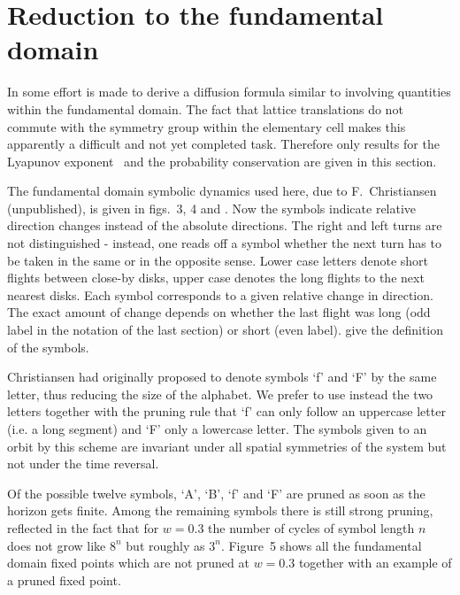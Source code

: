 \section{Reduction to the fundamental domain}

In  some effort is made to derive a diffusion formula similar to
 involving quantities within the fundamental domain. The
fact that lattice translations do not commute with the symmetry group within
the elementary cell makes this apparently a difficult and
not yet completed task.
Therefore only results for the Lyapunov exponent~ and the
probability conservation are given in this section.

The fundamental domain
symbolic dynamics used here, due to
F.~Christiansen (unpublished), is
given in figs.~3, 4 and . %
Now the symbols indicate relative direction changes
instead of the absolute directions.
The right and left turns are not distinguished - instead,  one reads
off a symbol whether the next
turn has to be taken in the same or in the opposite sense.
%
Lower case letters denote short flights between close-by disks, upper case
denotes the long flights to the next nearest disks.
Each symbol corresponds to a given relative change
in direction. The exact amount of
change depends on whether the last flight was
long (odd label in the notation of the last section) or short (even label).
give the definition of the symbols.

Christiansen had
originally proposed to denote symbols `f' and `F' by the same
letter, thus reducing the size of the alphabet.
We prefer to use instead the
two letters together with the
pruning rule that `f' can only follow an uppercase
letter (i.e. a long segment) and `F' only a lowercase letter.
The symbols given to an orbit by this scheme are invariant under all spatial
symmetries of the system but not under the time reversal.

Of the possible twelve symbols,  `A', `B', `f' and `F'
are pruned as soon as the horizon gets finite.
Among the remaining symbols there is
still strong pruning,  reflected in the fact that
for $w = 0.3$ the
number of cycles of symbol length $n$
does not grow like $8^n$ but roughly as
$3^n$. Figure~5 shows all the fundamental domain fixed
points which are not pruned at $w=0.3$ together with an example
of a pruned fixed point.


